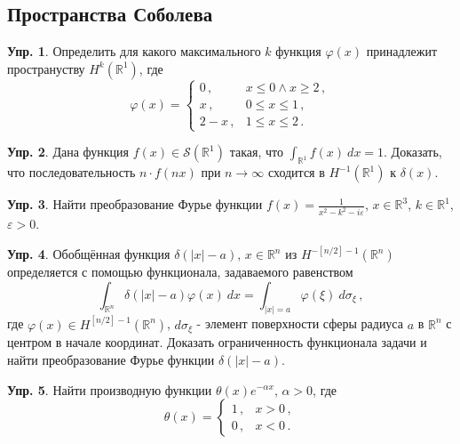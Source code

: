 \documentclass[a4paper, 12pt]{article}
\theoremstyle{definition}
\newtheorem{exercise}{Упр.}
\begin{document}
\subsection{Пространства Соболева} %

\begin{exercise} %
    Определить для какого максимального \({ k }\) функция \({ \varphi(x) }\) принадлежит пространуству \({ H^{k}(\mathbb R^{1}) }\), где \[
        \varphi(x) = \begin{cases}
            0\,, & x \leqslant 0 \land x \geqslant 2\,, \\
            x\,, & 0 \leqslant x \leqslant 1\,, \\
            2 - x\,, & 1 \leqslant x \leqslant 2\,.
        \end{cases}
    \]
\end{exercise}

\begin{exercise} %
    Дана функция \({ f(x) \in \mathcal S(\mathbb R^{1}) }\)  такая, что \({ \int_{\mathbb R^{1}} f(x)\: dx = 1 }\). Доказать, что последовательность \({ n \cdot f(nx) }\) при \({ n \to \infty }\) сходится в \({ H^{-1}(\mathbb R^{1}) }\) к \({ \delta(x) }\).
\end{exercise}

\begin{exercise} %
    Найти преобразование Фурье функции \({ f(x) = \frac{1}{x^2 - k^2 - i\varepsilon} }\), \({ x \in \mathbb R^{3} }\), \({ k \in \mathbb R^{1} }\), \({ \varepsilon > 0 }\).
\end{exercise}

\begin{exercise} %
    Обобщённая функция \({ \delta(\lvert x \rvert - a) }\), \({ x \in \mathbb R^{n} }\) из \({ H^{-[n/2]-1}(\mathbb R^{n}) }\) определяется с помощью функционала, задаваемого равенством \[
        \int_{\mathbb R^{n}}  \delta(\lvert x \rvert - a) \varphi(x)\: dx = \int_{\lvert x \rvert = a} \varphi(\xi)\: d\sigma_{\xi}\,,
    \] где \({ \varphi(x) \in H^{[n / 2]-1}(\mathbb R^{n}) }\), \({ d\sigma_{\xi} }\) - элемент поверхности сферы радиуса \({ a }\) в \({ \mathbb R^{n} }\) с центром в начале координат. Доказать ограниченность функционала задачи и найти преобразование Фурье функции \({ \delta(\lvert x \rvert - a) }\).
\end{exercise}

\begin{exercise} %
    Найти производную функции \({ \theta(x) e^{-\alpha x} }\), \({ \alpha > 0 }\), где \[
        \theta(x) = \begin{cases}
            1\,, & x > 0\,, \\
            0\,, & x < 0\,.
        \end{cases}
    \]
\end{exercise}
\end{document}
